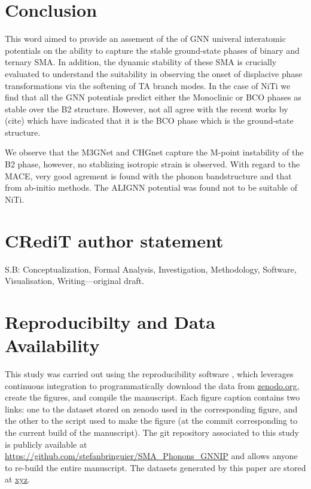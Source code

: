 \documentclass[preprint]{elsarticle}
\begin{document}
\section{Conclusion}
\label{sec:conclusion}
This word aimed to provide an assement of the of GNN univeral interatomic potentials on the ability to capture the stable ground-state phases of binary and ternary SMA. In addition, the dynamic stability of these SMA is crucially evaluated to understand the suitability in observing the onset of displacive phase transformations via the softening of TA branch modes. In the case of NiTi we find that all the GNN potentials predict either the Monoclinic or BCO phases as stable over the B2 structure. However, not all agree with the recent works by (cite) which have indicated that it is the BCO phase which is the ground-state structure.

We observe that the M3GNet and CHGnet capture the M-point instability of the B2 phase, however, no stablizing isotropic strain is observed. With regard to the MACE, very good agrement is found with the phonon bandstructure and that from ab-initio methods. The ALIGNN potential was found not to be suitable of NiTi.






\section*{CR\lowercase{e}d\lowercase{i}T author statement}

S.B: Conceptualization, Formal Analysis, Investigation, Methodology, Software, Visualisation, Writing---original draft.


\section*{Reproducibilty and Data Availability}
This study was carried out using the reproducibility software \href{https://github.com/showyourwork/showyourwork}{\showyourwork}, which leverages continuous integration to programmatically download the data from \href{https://zenodo.org/}{zenodo.org}, create the figures, and compile the manuscript. Each figure caption contains two links: one to the dataset stored on zenodo used in the corresponding figure, and the other to the script used to make the figure (at the commit corresponding to the current build of the manuscript). The git repository associated to this study is publicly available at \url{https://github.com/stefanbringuier/SMA_Phonons_GNNIP} and allows anyone to re-build the entire manuscript. The datasets generated by this paper are stored at \url{xyz}.
\end{document}
